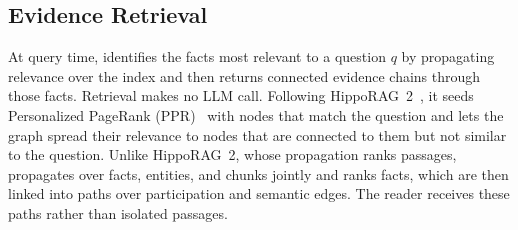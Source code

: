 
\subsection{Evidence Retrieval}
\label{sec:retrieval}

At query time, \sys{} identifies the facts most relevant to a question $q$ by
propagating relevance over the index and then returns connected evidence
chains through those facts. Retrieval makes no LLM call. Following
HippoRAG~2~\cite{gutierrez2025rag}, it seeds Personalized PageRank
(PPR)~\cite{haveliwala2002topic} with nodes that match the question and lets
the graph spread their relevance to nodes that are connected to them but not
similar to the question. Unlike HippoRAG~2, whose propagation ranks
passages, \sys{} propagates over facts, entities, and chunks jointly and ranks
facts, which are then linked into paths over participation and semantic
edges. The reader receives these paths rather than isolated passages.


